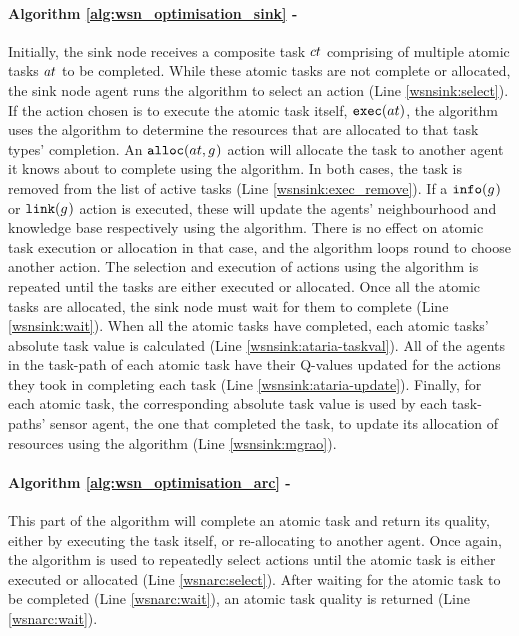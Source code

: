 \paragraph{Algorithm \ref{alg:wsn_optimisation_sink} - \acronymWSNOptimisationSink{}{}}
Initially, the sink node receives a composite task $\varCompositeTask{}{}$ comprising of multiple atomic tasks $\varAtomicTask{}{}$ to be completed. While these atomic tasks are not complete or allocated, the sink node agent runs the \acronymATARIA{}{} algorithm to select an action (Line \ref{wsnsink:select}).  If the action chosen is to execute the atomic task itself, $\functionExec{}{}$, the algorithm uses the \acronymMGRAO{}{} algorithm to determine the resources that are allocated to that task types' completion. An $\functionAlloc{}{}$ action will allocate the task to another agent it knows about to complete using the \acronymWSNOptimisationArc{}{} algorithm. In both cases, the task is removed from the list of active tasks  (Line \ref{wsnsink:exec_remove}). If a $\functionInfo{}{}$ or $\functionLink{}{}$ action is executed, these will update the agents' neighbourhood and knowledge base respectively using the \acronymATARIA{}{} algorithm. There is no effect on atomic task execution or allocation in that case, and the algorithm loops round to choose another action. The selection and execution of actions using the \acronymATARIA{}{} algorithm is repeated until the tasks are either executed or allocated. Once all the atomic tasks are allocated, the sink node must wait for them to complete (Line \ref{wsnsink:wait}). When all the atomic tasks have completed, each atomic tasks' absolute task value is calculated (Line \ref{wsnsink:ataria-taskval}). All of the agents in the task-path of each atomic task have their Q-values updated for the actions they took in completing each task (Line \ref{wsnsink:ataria-update}). Finally, for each atomic task, the corresponding absolute task value is used by each task-paths' sensor agent, the one that completed the task, to update its allocation of resources using the \acronymMGRAO{}{} algorithm (Line \ref{wsnsink:mgrao}).
\paragraph*{Algorithm \ref{alg:wsn_optimisation_arc} - \acronymWSNOptimisationArc{}{} }
This part of the algorithm will complete an atomic task and return its quality, either by executing the task itself, or re-allocating to another agent.  Once again,  the \acronymATARIA{}{} algorithm is used to repeatedly select actions until the atomic task is either executed or allocated (Line \ref{wsnarc:select}). After waiting for the atomic task to be completed (Line \ref{wsnarc:wait}),  an atomic task quality is returned (Line \ref{wsnarc:wait}).

